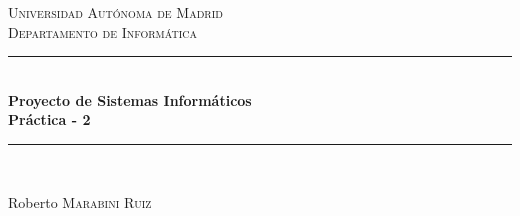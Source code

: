 \documentclass[12pt]{article} %
\begin{document}

\begin{titlepage}

\newcommand{\HRule}{\rule{\linewidth}{0.5mm}} %

\center %

\textsc{\LARGE Universidad Aut\'{o}noma de Madrid}\\[1.5cm] %
\textsc{\Large Departamento de Inform\'{a}tica}\\[0.5cm] %

\HRule \\[0.4cm]
{ \huge \bfseries Proyecto de Sistemas Inform\'{a}ticos\\[0.5cm] Pr\'{a}ctica - 2}\\[0.4cm] %
\HRule \\[1.5cm]





\vfill %
\begin{flushright}
 \large
Roberto  \textsc{Marabini Ruiz} %
\end{flushright}

\end{titlepage}
\end{document}
